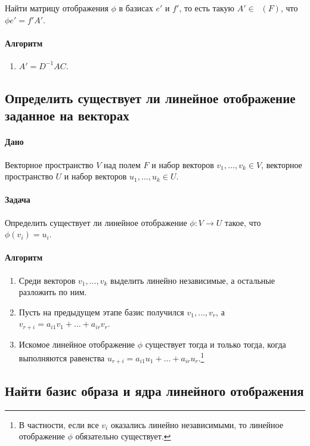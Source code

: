 \documentclass{article}
\newcommand{\MatrixDim}[3]{\mathop{\mathrm{M}_{#2\,#3}}(#1)}
\begin{document}
Найти матрицу отображения $\phi$ в базисах $e'$ и $f'$, то есть такую $A'\in \MatrixDim{F}{n}{m}$, что $\phi e' = f' A'$.

\paragraph{Алгоритм}
\begin{enumerate}
\item $A' = D^{-1} A C$.
\end{enumerate}


\subsection{Определить существует ли линейное отображение заданное на векторах}

\paragraph{Дано} Векторное пространство $V$ над полем $F$ и набор векторов $v_1,\ldots,v_k\in V$, векторное пространство $U$ и набор векторов $u_1,\ldots,u_k\in U$. 

\paragraph{Задача} Определить существует ли линейное отображение $\phi\colon V\to U$ такое, что $\phi(v_i) = u_i$.

\paragraph{Алгоритм}
\begin{enumerate}
\item Среди векторов $v_1,\ldots,v_k$ выделить линейно независимые, а остальные разложить по ним.

\item Пусть на предыдущем этапе базис получился $v_1,\ldots,v_r$, а $v_{r + i} = a_{i1} v_1 + \ldots + a_{ir}v_r$. 

\item Искомое линейное отображение $\phi$ существует тогда и только тогда, когда выполняются равенства $u_{r+i} = a_{i1}u_1 + \ldots + a_{ir}u_r$.\footnote{В частности, если все $v_i$ оказались линейно независимыми, то линейное отображение $\phi$ обязательно существует.}
\end{enumerate}

\subsection{Найти базис образа и ядра линейного отображения}
\end{document}

